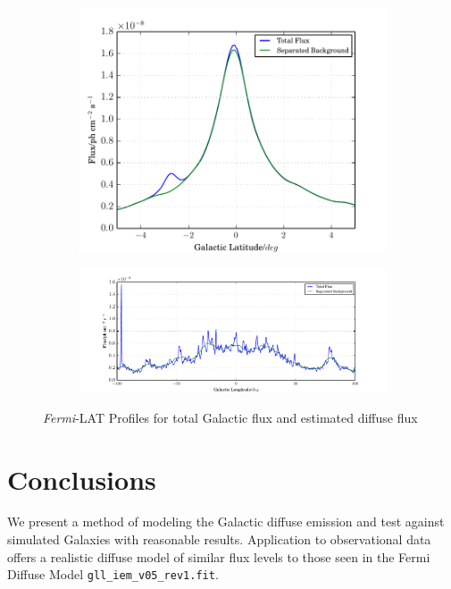 \documentclass{PoS}
\begin{document}
\begin{figure}
\centering
\begin{subfigure}{0.33\textwidth}
      \includegraphics[width=\textwidth]{figures/GLAT.pdf}
\end{subfigure}
\begin{subfigure}{0.66\textwidth}
        \includegraphics[width=\textwidth]{figures/GLON.pdf}
\end{subfigure}
\caption{\textit{Fermi}-LAT Profiles for total Galactic flux and estimated diffuse flux}
\end{figure}

\section{Conclusions}

We present a method of modeling the Galactic diffuse emission and test against simulated Galaxies with reasonable results. Application to observational data offers a realistic diffuse model of similar flux levels to those seen in the Fermi Diffuse Model \verb|gll_iem_v05_rev1.fit|.
\end{document}
